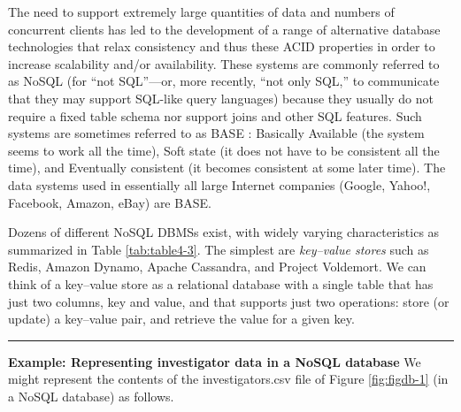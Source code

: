 \documentclass[]{krantz}
\begin{document}
The need to support extremely large quantities of data and numbers of
concurrent clients has led to the development of a range of alternative
database technologies that relax consistency and thus these ACID
properties in order to increase scalability and/or availability. These
systems are commonly referred to as NoSQL (for ``not SQL''---or, more
recently, ``not only SQL,'' to communicate that they may support
SQL-like query languages) because they usually do not require a fixed
table schema nor support joins and other SQL features. Such systems are
sometimes referred to as BASE \citep{fox1997cluster}: Basically
Available (the system seems to work all the time), Soft state (it does
not have to be consistent all the time), and Eventually consistent (it
becomes consistent at some later time). The data systems used in
essentially all large Internet companies (Google, Yahoo!, Facebook,
Amazon, eBay) are BASE.

Dozens of different NoSQL DBMSs exist, with widely varying
characteristics as summarized in Table \ref{tab:table4-3}. The simplest
are \emph{key--value stores} such as Redis, Amazon Dynamo, Apache
Cassandra, and Project Voldemort. We can think of a key--value store as
a relational database with a single table that has just two columns, key
and value, and that supports just two operations: store (or update) a
key--value pair, and retrieve the value for a given key.

\begin{center}\rule{0.5\linewidth}{\linethickness}\end{center}

\textbf{Example: Representing investigator data in a NoSQL database} We
might represent the contents of the investigators.csv file of Figure
\ref{fig:figdb-1} (in a NoSQL database) as follows.
\end{document}
